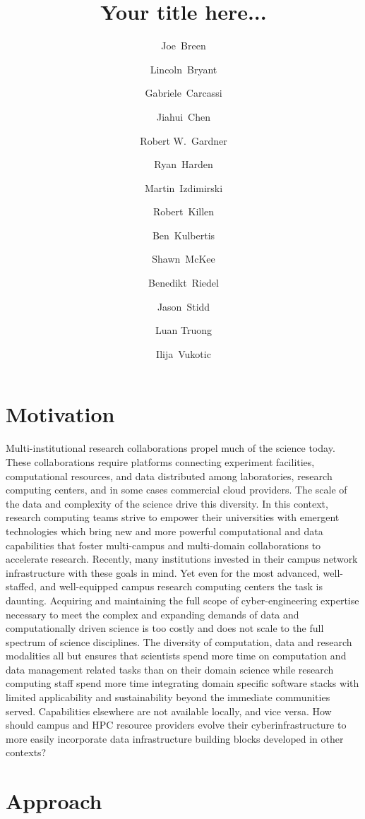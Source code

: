 \documentclass[sigconf]{acmart}
\title{Your title here...}
\author{Joe~Breen}
\affiliation{University of Utah}
\author{Lincoln~Bryant}
\affiliation{University of Chicago}
\author{Gabriele~Carcassi}
\affiliation{University of Michigan}
\author{Jiahui~Chen}
\affiliation{University of Utah}
\author{Robert W.~Gardner}
\affiliation{University of Chicago}
\author{Ryan~Harden}
\affiliation{University of Chicago}
\author{Martin~Izdimirski}
\affiliation{University of Utah}
\author{Robert~Killen}
\affiliation{University of Michigan}
\author{Ben~Kulbertis}
\affiliation{University of Utah}
\author{Shawn~McKee}
\affiliation{University of Michigan}
\author{Benedikt~Riedel}
\affiliation{University of Chicago}
\author{Jason~Stidd}
\affiliation{University of Utah}
\author{Luan Truong}
\affiliation{University of Utah}
\author{Ilija~Vukotic}
\affiliation{University of Chicago}
\begin{document}


\maketitle

\section{Motivation}
Multi-institutional research collaborations propel much of the science today.  These collaborations require platforms connecting experiment facilities, computational resources, and data distributed among laboratories, research computing centers, and in some cases commercial cloud providers. The scale of the data and complexity of the science drive this diversity.  In this context, research computing teams strive to empower their universities with emergent technologies which bring new and more powerful computational and data capabilities that foster multi-campus and multi-domain collaborations to accelerate research. Recently, many institutions invested in their campus network infrastructure with these goals in mind. Yet even for the most advanced, well-staffed, and well-equipped campus research computing centers the task is daunting.  Acquiring and maintaining the full scope of cyber-engineering expertise necessary to meet the complex and expanding demands of data and computationally driven science is too costly and does not scale to the full spectrum of science disciplines.  The diversity of computation, data and research modalities all but ensures that scientists spend more time on computation and data management related tasks than on their domain science while research computing staff spend more time integrating domain specific software stacks with limited applicability and sustainability beyond the immediate communities served. Capabilities elsewhere are not available locally, and vice versa.  How should campus and HPC resource providers evolve their cyberinfrastructure to more easily incorporate data infrastructure building blocks developed in other contexts? 

\section{Approach}
\end{document}
